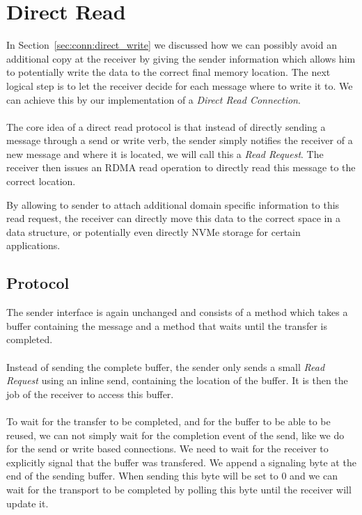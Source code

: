 
\section{Direct Read} \label{sec:conn:direct_read}

In Section~\ref{sec:conn:direct_write} we discussed how we can possibly avoid an additional copy at the receiver by giving 
the sender information which allows him to potentially write the data to the correct final memory location. The next logical
step is to let the receiver decide for each message where to write it to. We can achieve this by our implementation of a
\emph{Direct Read Connection}.

\paragraph{} The core idea of a direct read protocol is that instead of directly sending a message through a send or write 
verb, the sender simply notifies the receiver of a new message and where it is located, we will call this a \emph{Read Request}.
The receiver then issues an RDMA read operation to directly read this message to the correct location.

By allowing to sender to attach additional domain specific information to this read request, the receiver can directly 
move this data to the correct space in a data structure, or potentially even directly NVMe storage for certain applications.


\subsection{Protocol}
The sender interface is again unchanged and consists of a  method which takes a buffer containing the
message and a  method that waits until the transfer is completed.

\paragraph{} Instead of sending the complete buffer, the sender only sends a small \emph{Read Request} using an inline send,
containing the location of the buffer. It is then the job of the receiver to access this buffer.

\paragraph{} To wait for the transfer to be completed, and for the buffer to be able to be reused, we can not simply wait 
for the completion event of the send, like we do for the send or write based connections. We need to wait for the receiver 
to explicitly signal that the buffer was transfered. We append a signaling byte at the end of the sending buffer. 
When sending this byte will be set to 0 and we can wait for the transport to be completed by polling this byte until the 
receiver will update it.

